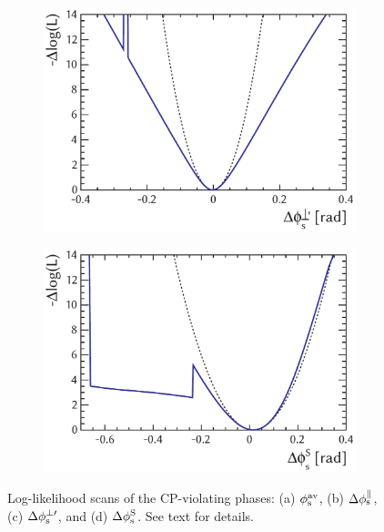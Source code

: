 \begin{figure}[tb]
  \vspace*{0.02\textwidth}
  \begin{subfigure}{0.49\textwidth}
    \includegraphics[width=\textwidth]{graphics/results/NLL_polarDep_phiCPRel_AperpApar}
    \caption{}
  \end{subfigure}
  \hfill%
  \begin{subfigure}{0.49\textwidth}
    \includegraphics[width=\textwidth]{graphics/results/NLL_polarDep_phiCPRel_AS}
    \caption{}
  \end{subfigure}

  \caption{Log-likelihood scans of the CP-violating phases: (a) $\phi_\text{s}^{\text{av}}$, (b) $\Delta\phi_\text{s}^{\parallel}$, (c) $\Delta\phi_\text{s}^{\perp\prime}$, and (d) $\Delta\phi_\text{s}^{\text{S}}$.
           See text for details.}
  \label{fig:NLL_CPV_phases}
\end{figure}

